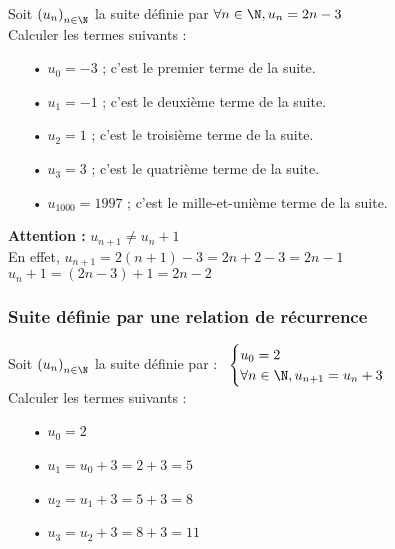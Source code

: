 Soit $\left(u_n\right)_{n \in \N}$ la suite définie par $\forall n \in \N, u_n = 2n - 3$ \\

Calculer les termes suivants : \\

\begin{itemize}
\item[•] $u_0 = -3$ ; c'est le premier terme de la suite.
\item[•] $u_1 = -1$ ; c'est le deuxième terme de la suite.
\item[•] $u_2 = 1$ ; c'est le troisième terme de la suite.
\item[•] $u_3 = 3$ ; c'est le quatrième terme de la suite.
\item[•] $u_{1000} = 1997$ ; c'est le mille-et-unième terme de la suite.
\end{itemize}

\vspace*{.3cm}

\textbf{Attention : } $u_{n+1} \neq u_n + 1$ \\

En effet, $u_{n+1} = 2\left(n+1\right) -3 = 2n + 2 - 3 = 2n - 1 $ \\

$u_n + 1 = \left(2n - 3\right) + 1 = 2n - 2$

\newpage

\subsubsection{Suite définie par une relation de récurrence}

Soit $\left(u_n\right)_{n \in \N}$ la suite définie par :$ \; \; \; \begin{cases}
u_0 = 2 \\
\forall n \in \N, u_{n+1} = u_n + 3 \\
\end{cases}$ \\

Calculer les termes suivants : 

\begin{itemize}
\item[•] $u_0 = 2$
\item[•] $ u_1 = u_0 + 3 = 2 + 3 = 5$ 
\item[•] $ u_2 = u_1 + 3 = 5 + 3 = 8$ 
\item[•] $ u_3 = u_2 + 3 = 8 + 3 = 11$
\end{itemize}


